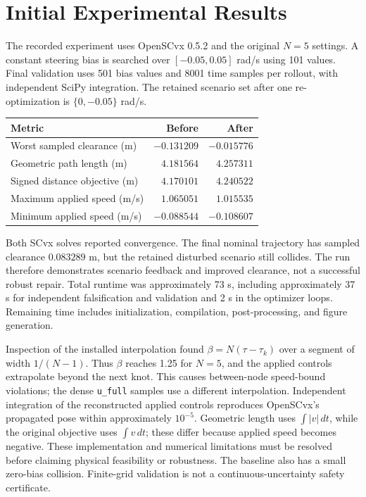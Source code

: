 \documentclass{article}
\begin{document}
\section{Initial Experimental Results}
The recorded experiment uses OpenSCvx 0.5.2 and the original $N=5$
settings. A constant steering bias is searched over $[-0.05,0.05]$ rad/s
using 101 values. Final validation uses 501 bias values and 8001 time
samples per rollout, with independent SciPy integration. The retained
scenario set after one re-optimization is $\{0,-0.05\}$ rad/s.

\begin{center}
\begin{tabular}{lrr}
\hline
Metric & Before & After\\
\hline
Worst sampled clearance (m) & $-0.131209$ & $-0.015776$\\
Geometric path length (m) & $4.181564$ & $4.257311$\\
Signed distance objective (m) & $4.170101$ & $4.240522$\\
Maximum applied speed (m/s) & $1.065051$ & $1.015535$\\
Minimum applied speed (m/s) & $-0.088544$ & $-0.108607$\\
\hline
\end{tabular}
\end{center}

Both SCvx solves reported convergence. The final nominal trajectory has
sampled clearance $0.083289$ m, but the retained disturbed scenario still
collides. The run therefore demonstrates scenario feedback and improved
clearance, not a successful robust repair. Total runtime was approximately
73 s, including approximately 37 s for independent falsification and
validation and 2 s in the optimizer loops. Remaining time includes
initialization, compilation, post-processing, and figure generation.

Inspection of the installed interpolation found
$\beta=N(\tau-\tau_k)$ over a segment of width $1/(N-1)$.
Thus $\beta$ reaches 1.25 for $N=5$, and the applied controls extrapolate
beyond the next knot. This causes between-node speed-bound violations;
the dense \texttt{u\_full} samples use a different interpolation.
Independent integration of the reconstructed applied controls reproduces
OpenSCvx's propagated pose within approximately $10^{-5}$.
Geometric length uses $\int |v|\,dt$, while the original objective uses
$\int v\,dt$; these differ because applied speed becomes negative.
These implementation and numerical limitations must be resolved before
claiming physical feasibility or robustness. The baseline also has a small
zero-bias collision. Finite-grid validation is not a continuous-uncertainty
safety certificate.
\end{document}
